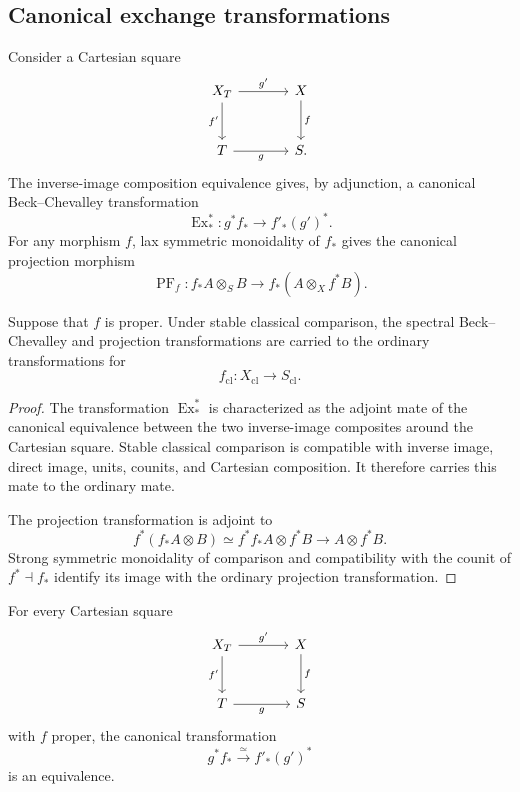 \subsection{Canonical exchange transformations}

Consider a Cartesian square
\[
\begin{tikzcd}[column sep=large,row sep=large]
    X_T \arrow[r,"g'"] \arrow[d,"f'"']
        & X \arrow[d,"f"] \\
    T \arrow[r,"g"'] & S.
\end{tikzcd}
\]
The inverse-image composition equivalence gives, by adjunction, a canonical
Beck--Chevalley transformation
\[
    \operatorname{Ex}^{*}_{*}:
    g^*f_*
    \longrightarrow
    f'_*(g')^*.
\]
For any morphism \(f\), lax symmetric monoidality of \(f_*\) gives the
canonical projection morphism
\[
    \operatorname{PF}_f:
    f_*A\otimes_SB
    \longrightarrow
    f_*(A\otimes_Xf^*B).
\]

\begin{lemma}
\label{lem:comparison-proper-transformations}
Suppose that \(f\) is proper.  Under stable classical comparison, the
spectral Beck--Chevalley and projection transformations are carried to the
ordinary transformations for
\[
    f_{\mathrm{cl}}:
    X_{\mathrm{cl}}
    \longrightarrow
    S_{\mathrm{cl}}.
\]
\end{lemma}

\begin{proof}
The transformation \(\operatorname{Ex}^{*}_{*}\) is characterized as the
adjoint mate of the canonical equivalence between the two inverse-image
composites around the Cartesian square.  Stable classical comparison is
compatible with inverse image, direct image, units, counits, and Cartesian
composition.  It therefore carries this mate to the ordinary mate.

The projection transformation is adjoint to
\[
    f^*(f_*A\otimes B)
    \simeq
    f^*f_*A\otimes f^*B
    \longrightarrow
    A\otimes f^*B.
\]
Strong symmetric monoidality of comparison and compatibility with the
counit of \(f^*\dashv f_*\) identify its image with the ordinary projection
transformation.
\end{proof}

\begin{theorem}
\label{thm:proper-base-change}
For every Cartesian square
\[
\begin{tikzcd}[column sep=large,row sep=large]
    X_T \arrow[r,"g'"] \arrow[d,"f'"']
        & X \arrow[d,"f"] \\
    T \arrow[r,"g"'] & S
\end{tikzcd}
\]
with \(f\) proper, the canonical transformation
\[
    g^*f_*
    \xrightarrow{\simeq}
    f'_*(g')^*
\]
is an equivalence.
\end{theorem}

